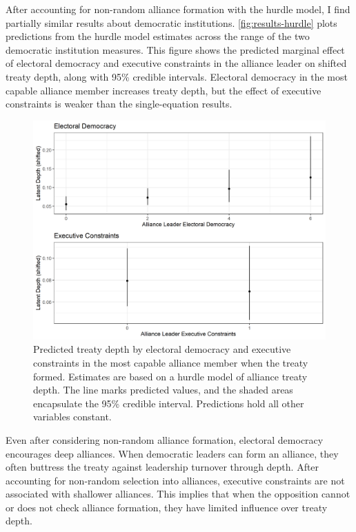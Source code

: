 \documentclass[12pt]{article}
\begin{document}
After accounting for non-random alliance formation with the hurdle model, I find partially similar results about democratic institutions. 
\autoref{fig:results-hurdle} plots predictions from the hurdle model estimates across the range of the two democratic institution measures. 
This figure shows the predicted marginal effect of electoral democracy and executive constraints in the alliance leader on shifted treaty depth, along with 95\% credible intervals.
Electoral democracy in the most capable alliance member increases treaty depth, but the effect of executive constraints is weaker than the single-equation results.  


\begin{figure}
\includegraphics[width=.95\textwidth]{../figures/results-hurdle.png}  
\caption{Predicted treaty depth by electoral democracy and executive constraints in the most capable alliance member when the treaty formed. Estimates are based on a hurdle model of alliance treaty depth. The line marks predicted values, and the shaded areas encapsulate the 95\% credible interval. Predictions hold all other variables constant.}
\label{fig:results-hurdle}
\end{figure}


Even after considering non-random alliance formation, electoral democracy encourages deep alliances. 
When democratic leaders can form an alliance, they often buttress the treaty against leadership turnover through depth. 
After accounting for non-random selection into alliances, executive constraints are not associated with shallower alliances.
This implies that when the opposition cannot or does not check alliance formation, they have limited influence over treaty depth. 
\end{document}
